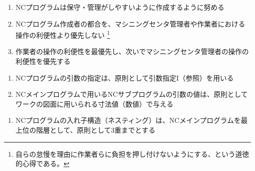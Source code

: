 




\begin{enumerate}[label=\alph*)]
\item {}NCプログラムは保守・管理がしやすいように作成するように努める
\item {}NCプログラム作成者の都合を、マシニングセンタ管理者や作業者における操作の利便性より優先しない
\footnote{自らの怠慢を理由に作業者らに負担を押し付けないようにする、という道徳的心得である。}
\item 作業者の操作の利便性を最優先し、次いでマシニングセンタ管理者の操作の利便性を優先する
\end{enumerate}



\begin{enumerate}[label=\alph*)]
\item NCプログラムの引数の指定は、原則として引数指定I（参照）を用いる
\item {}NCメインプログラムで用いるNCサブプログラムの引数の値は、原則としてワークの図面に用いられる寸法値（数値）で与える
\end{enumerate}



\begin{enumerate}[label=\alph*)]
\item NCプログラムの入れ子構造（ネスティング）は、NCメインプログラムを最上位の階層として、原則として3重までとする
\end{enumerate}



